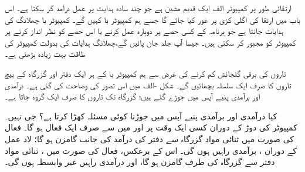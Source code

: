   ارتقائی طور پر کمپیوٹر الف  ایک قدیم  مشین ہے جو  چند سادہ ہدایت پر عمل درآمد کر سکتا ہے۔ اس باب میں  ارتقا کی اگلی کڑی  پر غور کیا جائے گا جسے ہم کمپیوٹر با کہیں گے۔ کمپیوٹر با چھلانگ  کی ہدایات  جانتا ہے جو   برنامہ  کے کسی   حصے پر دوبارہ  عمل کرنے  یا اس حصے کو نظر انداز کرنے پر کمپیوٹر کو  مجبور کر سکتی ہیں۔ جیسا آپ جلد جان پائیں گے،چھلانگ  ہدایات  کی بدولت   کمپیوٹر کی طاقت بہت زیادہ  بڑھتی ہے۔
  
  تاروں کی  برقی گنجائش کم کرنے کی غرض سے ہم کمپیوٹر با   کے ہر ایک دفتر اور  گزرگاہ کے بیچ   تاروں کا صرف ایک سلسلہ بچھائیں گے۔  شکل -الف   میں   اس تصور کی وضاحت کی گئی ہے۔ درآمدی اور برآمدی پنیے آپس میں جوڑے گئے ہیں؛ گزرگاہ  تک  تاروں کا  صرف  ایک گروہ  جاتا ہے۔
  
کیا درآمدی اور برآمدی پنیے آپس میں جوڑنا کوئی  مسئلہ کھڑا کرتا ہے؟ جی نہیں۔ کمپیوٹر کی دوڑ کے دوران کسی ایک وقت پر   اور میں  سے  صرف ایک  فعال ہو گا۔ فعال   کی صورت میں  ثنائی مواد گزرگاہ سے دفتر  کی  درآمد    کی جانب گامزن ہو گا؛ لاد  عمل کے دوران ، برآمدی راہیں ہوں گی۔ اس کے برعکس،  فعال  کی صورت میں ،  ثنائی مواد دفتر سے  گزرگاہ کی طرف گامزن ہو گا، اور درآمدی راہیں غیر وابسطہ ہوں گی۔

